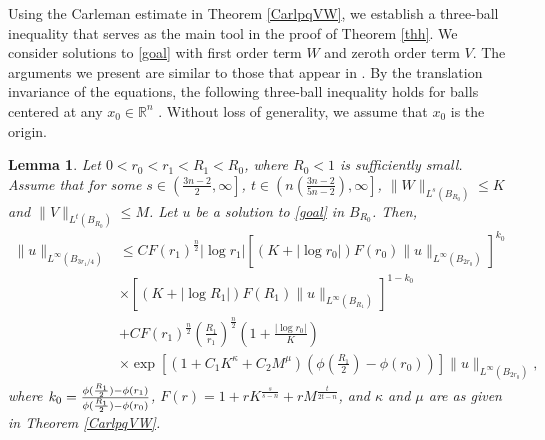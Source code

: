 \documentclass[11pt]{amsart}
\theoremstyle{plain}
\newtheorem{lemma}{Lemma}
\numberwithin{equation}{section}
\begin{document}
Using the Carleman estimate in Theorem \ref{CarlpqVW}, we establish
a three-ball inequality that serves as the main tool in the proof of
Theorem \ref{thh}. We consider solutions to \eqref{goal} with first
order term $W$ and zeroth order term $V$. The arguments we present
are similar to those that appear in \cite{Ken07}.
By the translation invariance of the equations, the following three-ball inequality holds for balls centered at any $x_0 \in {\ensuremath{\mathbb{R}}}^n$ .
Without loss of generality, we assume that $x_0$ is the origin.

\begin{lemma}
Let $0 < r_0< r_1< R_1 < R_0$, where $R_0 < 1$ is sufficiently small.
Assume that for some $s \in {\left( { \frac{3n-2}{2}, {\infty}} \right] }$, $t \in {\left( { n{\left( {\frac{3n-2}{5n-2}} \right) }, {\infty}} \right] }$, $\|W\|_{L^s{\left( {B_{R_0}} \right) }} \le K$ and $\|V\|_{L^t{\left( {B_{R_0}} \right) }} \le M$.
Let $u$ be a solution to \eqref{goal} in $B_{R_0}$.
Then,
\begin{align}
\|u\|_{L^\infty {\left( {B_{3r_1/4}} \right) }} &\le C F{\left( {r_1} \right) }^{\frac n 2}  |\log
r_1| {\left[{ (K+|\log r_0|)F{\left( {r_0} \right) } \|u\|_{L^{\infty}(B_{2r_0})}}\right]}^{k_0} \nonumber \\
&\times {\left[{(K+|\log
R_1|)  F{\left( {R_1} \right) }\|u\|_{L^{\infty}(B_{R_1})}}\right]}^{1 - k_0} \nonumber \\
&+C F{\left( {r_1} \right) }^{\frac n 2} {\left( {\frac{R_1 }{r_1}} \right) }^{\frac n 2} {\left( {1 +\frac{|\log r_0|}{K}} \right) } \nonumber \\
&\times \exp{\left[{{\left( {1 + C_1 K^\kappa + C_2 M^\mu} \right) } {\left( {\phi{\left( {\frac{R_1}{2}} \right) }-\phi(r_0)} \right) }}\right]} \|u\|_{L^{\infty}(B_{2r_0})},
\label{three}
\end{align}
where ${\displaystyle} k_0 =
\frac{\phi(\frac{R_1}{2})-\phi(r_1)}{\phi(\frac{R_1}{2})-\phi(r_0)}$,
$F{\left( {r} \right) } = 1 + r K^{\frac{s}{s-n}} + r M^{\frac{t}{2t-n}}$, and
$\kappa$ and $\mu$ are as given in Theorem \ref{CarlpqVW}.
\end{lemma}
\end{document}
